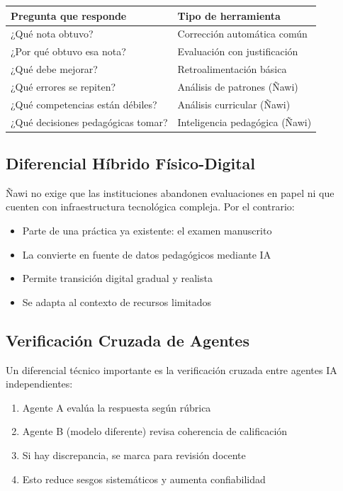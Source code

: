 \documentclass[12pt]{article}
\begin{document}
\begin{center}
\begin{tabular}{p{4.5cm} p{5.5cm}}
\toprule
\textbf{Pregunta que responde} & \textbf{Tipo de herramienta} \\
\midrule
¿Qué nota obtuvo? & Corrección automática común \\
¿Por qué obtuvo esa nota? & Evaluación con justificación \\
¿Qué debe mejorar? & Retroalimentación básica \\
¿Qué errores se repiten? & Análisis de patrones (Ñawi) \\
¿Qué competencias están débiles? & Análisis curricular (Ñawi) \\
¿Qué decisiones pedagógicas tomar? & Inteligencia pedagógica (Ñawi) \\
\bottomrule
\end{tabular}
\end{center}

\subsection{Diferencial Híbrido Físico-Digital}

Ñawi no exige que las instituciones abandonen evaluaciones en papel ni que cuenten con infraestructura tecnológica compleja. Por el contrario:

\begin{itemize}
    \item Parte de una práctica ya existente: el examen manuscrito
    \item La convierte en fuente de datos pedagógicos mediante IA
    \item Permite transición digital gradual y realista
    \item Se adapta al contexto de recursos limitados
\end{itemize}

\subsection{Verificación Cruzada de Agentes}

Un diferencial técnico importante es la verificación cruzada entre agentes IA independientes:

\begin{enumerate}
    \item Agente A evalúa la respuesta según rúbrica
    \item Agente B (modelo diferente) revisa coherencia de calificación
    \item Si hay discrepancia, se marca para revisión docente
    \item Esto reduce sesgos sistemáticos y aumenta confiabilidad
\end{enumerate}
\end{document}
